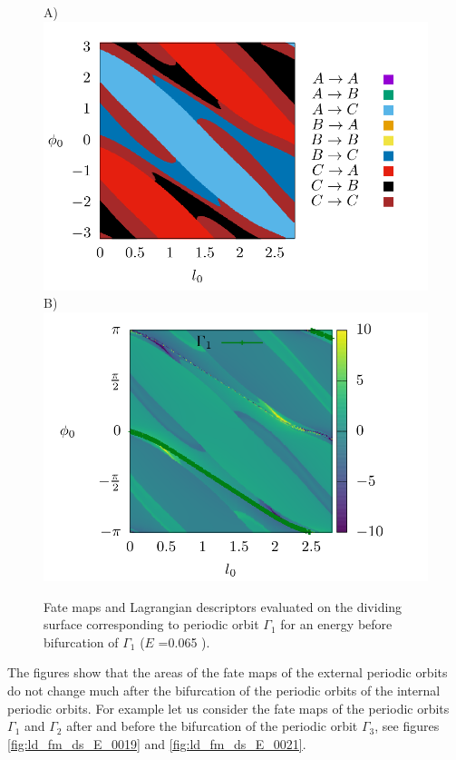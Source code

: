 \documentclass[10pt,aps,onecolumn,superscriptaddress]{revtex4-2}
\begin{document}
\begin{figure}[htbp]
	A)\includegraphics[scale=0.35]{fate_map_ds_gamma1E_0065.png}
	B)\includegraphics[scale=0.35]{ld_action_ds_gamma1_E_0065.png}
	\caption{ Fate maps and Lagrangian descriptors evaluated on the dividing surface corresponding to periodic orbit $\Gamma_1$ for an energy before bifurcation of $\Gamma_1$ ($E$ =0.065 ). }
	\label{fig:ld_fm_ds_E_0065}
\end{figure}


The figures show that the areas of the fate maps of the external periodic orbits do not change much after the bifurcation of the periodic orbits of the internal periodic orbits. For example let us consider the fate maps of the periodic orbits $\Gamma_1$ and $\Gamma_2$ after and before the bifurcation of the periodic orbit $\Gamma_3$, see figures \ref{fig:ld_fm_ds_E_0019} and \ref{fig:ld_fm_ds_E_0021}.  
\end{document}

